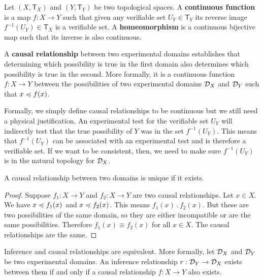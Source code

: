 \documentclass[11pt,letterpaper,fleqn]{memoir} %
\begin{document}
\begin{mathSection}
	\begin{defn}
		Let $(X, \mathsf{T}_X)$ and $(Y, \mathsf{T}_Y)$ be two topological spaces. A \textbf{continuous function} is a map $f: X \to Y$ such that given any verifiable set $U_Y \in \mathsf{T}_Y$ its reverse image $f^{-1}(U_Y) \in \mathsf{T}_X$ is a verifiable set. A \textbf{homeomorphism} is a continuous bijective map such that its inverse is also continuous.
	\end{defn}
	\begin{defn}
		A \textbf{causal relationship} between two experimental domains establishes that determining which possibility is true in the first domain also determines which possibility is true in the second. More formally, it is a continuous function $f : X \to Y$ between the possibilities of two experimental domains $\mathcal{D}_X$ and $\mathcal{D}_Y$ such that $x \preccurlyeq f(x)$.
	\end{defn}
	\begin{justification}
		Formally, we simply define causal relationships to be continuous but we still need a physical justification. An experimental test for the verifiable set $U_Y$ will indirectly test that the true possibility of $Y$ was in the set $f^{-1}(U_Y)$. This means that $f^{-1}(U_Y)$ can be associated with an experimental test and is therefore a verifiable set. If we want to be consistent, then, we need to make sure $f^{-1}(U_Y)$ is in the natural topology for $\mathcal{D}_X$.
	\end{justification}
	\begin{coro}
		A causal relationship between two domains is unique if it exists.
	\end{coro}\label{prop_causal_relationship_unique}
	\begin{proof}
		Suppose $f_1 : X \to Y$ and $f_2 : X \to Y$ are two causal relationships. Let $x \in X$. We have $x \preccurlyeq f_1(x)$ and $x \preccurlyeq f_2(x)$. This means $f_1(x) \comp f_2(x)$. But these are two possibilities of the same domain, so they are either incompatible or are the same possibilities. Therefore $f_1(x) \equiv f_2(x)$ for all $x \in X$. The causal relationships are the same.
	\end{proof}
	\begin{thrm}
		Inference and causal relationships are equivalent. More formally, let $\mathcal{D}_X$ and $\mathcal{D}_Y$ be two experimental domains. An inference relationship $r: \mathcal{D}_Y \to \mathcal{D}_X$ exists between them if and only if a causal relationship $f: X \to Y$ also exists.

\end{thrm}
\end{mathSection}
\end{document}
